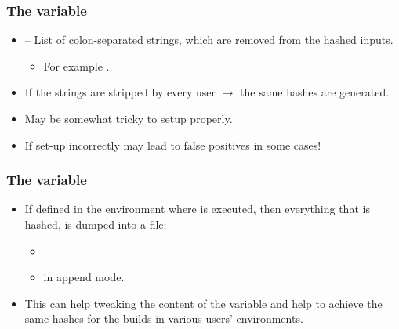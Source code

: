 \documentclass[compress,table,xcolor=table]{beamer}
\begin{document}
\begin{frame}
  \frametitle{The  variable}
  \Large
  \begin{itemize}
  \item {} -- List of colon-separated strings, which
      are removed from the hashed inputs.
  \begin{itemize}
  \item For example .
  \end{itemize}
  \item If the  strings are stripped by every user $\rightarrow$
      the same hashes are generated.
  \item {\larger May be somewhat tricky to setup properly.}
  \item {If set-up incorrectly may lead to false positives in some cases!}
  \end{itemize}
\end{frame}
\begin{frame}
  \frametitle{The  variable}
  \Large
  \begin{itemize}
  \item If defined in the environment where  is
      executed, then everything that is hashed, is dumped into a file:
  \begin{itemize}
      \item {}
      \item in append mode.
  \end{itemize}
  \item This can help tweaking the content of the 
      variable and help to achieve the same hashes for the  builds
      in various users' environments.
  \end{itemize}
\end{frame}
\end{document}
